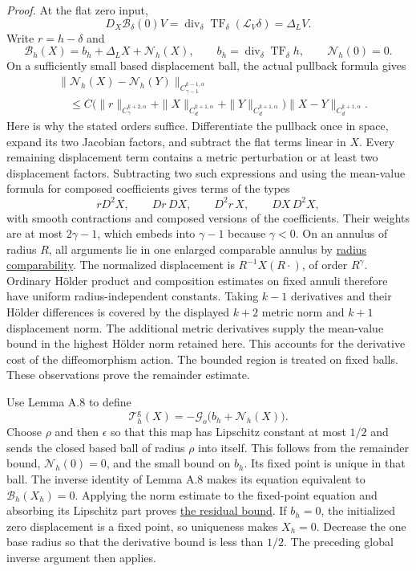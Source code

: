 \documentclass[
  english,
  11pt,
  reqno]{amsart}
\begin{document}
\emph{Proof.} At the flat zero input,%
 \[
D_X\mathcal B_\delta(0)V
=\operatorname{div}_\delta\operatorname{TF}_\delta
 (\mathcal L_V\delta)
=\Delta_LV.
\] Write \(r=h-\delta\) and \[
\mathcal B_h(X)=b_h+\Delta_LX+\mathcal N_h(X),
\qquad
b_h=\operatorname{div}_\delta\operatorname{TF}_\delta h,
\qquad \mathcal N_h(0)=0.
\] On a sufficiently small based displacement ball, the actual pullback
formula gives%
 \[
\begin{aligned}
&\|\mathcal N_h(X)-\mathcal N_h(Y)\|_{C^{k-1,\alpha}_{\gamma-1}}
\\[-.3ex]&\quad\le C\bigl(\|r\|_{C^{k+2,\alpha}_\gamma}
+\|X\|_{C^{k+1,\alpha}_d}
+\|Y\|_{C^{k+1,\alpha}_d}\bigr)
\|X-Y\|_{C^{k+1,\alpha}_d}.
\end{aligned}
\] Here is why the stated orders suffice. Differentiate the pullback
once in space, expand its two Jacobian factors, and subtract the flat
terms linear in \(X\). Every remaining displacement term contains a
metric perturbation or at least two displacement factors. Subtracting
two such expressions and using the mean-value formula for composed
coefficients gives terms of the types \[
rD^2X,\qquad Dr\,DX,\qquad D^2r\,X,
\qquad DX\,D^2X,
\] with smooth contractions and composed versions of the coefficients.
Their weights are at most \(2\gamma-1\), which embeds into \(\gamma-1\)
because \(\gamma<0\). On an annulus of radius \(R\), all arguments lie
in one enlarged comparable annulus by
\hyperref[eq:online-gauge-radius-comparability]{radius comparability}.
The normalized displacement is \(R^{-1}X(R\cdot)\), of order
\(R^\gamma\). Ordinary Hölder product and composition estimates on fixed
annuli therefore have uniform radius-independent constants. Taking
\(k-1\) derivatives and their Hölder differences is covered by the
displayed \(k+2\) metric norm and \(k+1\) displacement norm. The
additional metric derivatives supply the mean-value bound in the highest
Hölder norm retained here. This accounts for the derivative cost of the
diffeomorphism action. The bounded region is treated on fixed balls.
These observations prove the remainder estimate.

Use Lemma A.8 to define%
 \[
\mathcal T_h^{\mathrm g}(X)
=-\mathcal G_o\bigl(b_h+\mathcal N_h(X)\bigr).
\] Choose \(\rho\) and then \(\epsilon\) so that this map has Lipschitz
constant at most \(1/2\) and sends the closed based ball of radius
\(\rho\) into itself. This follows from the remainder bound,
\(\mathcal N_h(0)=0\), and the small bound on \(b_h\). Its fixed point
is unique in that ball. The inverse identity of Lemma A.8 makes its
equation equivalent to \(\mathcal B_h(X_h)=0\). Applying the norm
estimate to the fixed-point equation and absorbing its Lipschitz part
proves \hyperref[eq:online-gauge-residual-displacement-bound]{the
residual bound}. If \(b_h=0\), the initialized zero displacement is a
fixed point, so uniqueness makes \(X_h=0\). Decrease the one base radius
so that the derivative bound is less than \(1/2\). The preceding global
inverse argument then applies.
\end{document}
